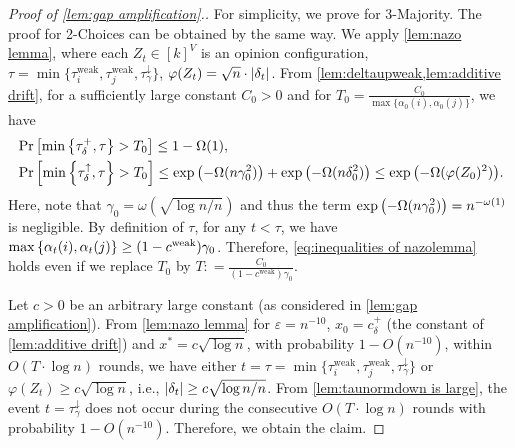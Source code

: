 \documentclass[letterpaper,11pt]{article}
\def\defeq{\mathrel{\mathop:}=}
\newcommand{\alphanorm}{\gamma}
\newcommand{\taudeltaplus}{\tau^{+}_\delta}
\newcommand{\cweak}{c^{\mathrm{weak}}}
\newcommand{\cdeltaplus}{c^{+}_\delta}
\newcommand{\taunormdown}{\tau^{\downarrow}_\alphanorm}
\newcommand{\taudeltaup}{\tau^{\uparrow}_\delta}
\newcommand{\tauiweak}{\tau^{\mathrm{weak}}_i}
\newcommand{\taujweak}{\tau^{\mathrm{weak}}_j}
\begin{document}
\begin{proof}[Proof of \cref{lem:gap amplification}.]
  For simplicity, we prove for 3-Majority.
  The proof for 2-Choices can be obtained by the same way.
  We apply \cref{lem:nazo lemma}, where each $ Z_t \in [k]^V $ is an opinion configuration,
  $ \tau = \min\{\tauiweak,\taujweak,\taunormdown\} $, $ \varphi(Z_t) = \sqrt{n}\cdot \abs{\delta_t} $.
  From \cref{lem:deltaupweak,lem:additive drift}, for a sufficiently large constant $ C_0>0 $ and for $ T_0 = \frac{C_0}{\max\{\alpha_0(i),\alpha_0(j)\}} $, we have
  \begin{equation} \label{eq:inequalities of nazolemma}
    \begin{aligned}
    &\Pr\qty[ \min\qty{ \taudeltaplus,\tau } > T_0 ] \le 1-\Omega(1),\\
    &\Pr\qty[ \min\qty{ \taudeltaup, \tau } > T_0 ] \le \exp\qty( -\Omega(n\alphanorm_0^2) ) + \exp\qty( -\Omega(n\delta_0^2) ) \le \exp\qty( -\Omega(\varphi(Z_0)^2) ).
    \end{aligned}
  \end{equation}
  Here, note that $ \alphanorm_0 = \omega(\sqrt{\log n/n}) $ and thus the term $ \exp\qty( -\Omega(n\alphanorm_0^2) ) = n^{-\omega(1)}$ is negligible.
  By definition of $ \tau $, for any $ t < \tau $, we have $ \max\qty{\alpha_t(i),\alpha_t(j)} \ge (1-\cweak)\alphanorm_0 $.
  Therefore, \cref{eq:inequalities of nazolemma} holds even if we replace $ T_0 $ by $ T\defeq \frac{C_0}{(1-\cweak)\alphanorm_0} $.

  Let $ c >0$ be an arbitrary large constant (as considered in \cref{lem:gap amplification}).
  From \cref{lem:nazo lemma} for $ \varepsilon = n^{-10} $, $ x_0 = \cdeltaplus $ (the constant of \cref{lem:additive drift}) and $ x^*=c\sqrt{\log n} $, with probability $ 1-O(n^{-10}) $,
  within $ O(T\cdot \log n) $ rounds, we have either $ t= \tau = \min\{\tauiweak,\taujweak,\taunormdown\}$ or $ \varphi(Z_t) \ge c\sqrt{\log n} $, i.e., $ \abs{\delta_t} \ge c\sqrt{\log n / n} $.
  From \cref{lem:taunormdown is large}, the event $ t=\taunormdown $ does not occur during the consecutive $ O(T\cdot \log n) $ rounds with probability $ 1-O(n^{-10}) $.
  Therefore, we obtain the claim.
\end{proof}
\end{document}
